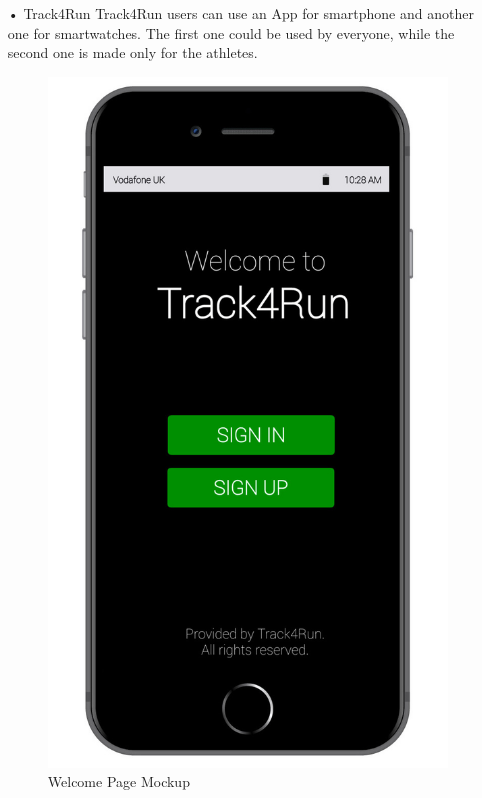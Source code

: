 \begin{enumerate}
\item[•]{\Large Track4Run}
\bigbreak
\noindent
Track4Run users can use an App for smartphone and another one for smartwatches. The first one could be used by everyone, while the second one is made only for the athletes.
\\[0.5 cm]
\begin{figure}[H]
\begin{center}
        \begin{minipage}[c]{.40\textwidth}
        \centering
          \includegraphics[height=14 cm]{Images/Mockups/Track4RunMockup1.jpg}
	\caption{Welcome Page Mockup}
        \end{minipage}%
        \hspace{10mm}%
        \begin{minipage}[c]{.40\textwidth}
        \centering

\end{minipage}
\end{center}
\end{figure}
\end{enumerate}
